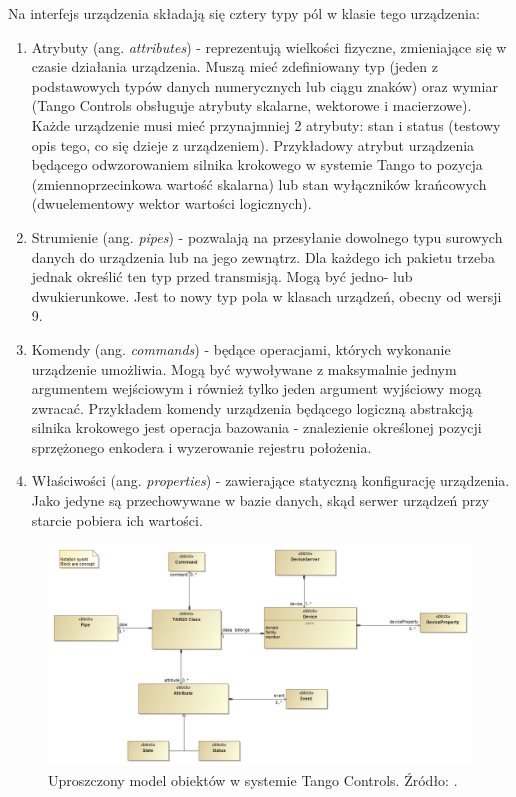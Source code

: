 Na interfejs urządzenia składają się cztery typy pól w klasie tego urządzenia:
\begin{enumerate}
    \item Atrybuty (ang. \emph{attributes}) - reprezentują wielkości fizyczne, zmieniające się w czasie działania urządzenia. Muszą mieć zdefiniowany typ (jeden z podstawowych typów danych numerycznych lub ciągu znaków) oraz wymiar (Tango Controls obsługuje atrybuty skalarne, wektorowe i macierzowe). Każde urządzenie musi mieć przynajmniej 2 atrybuty: stan i status (testowy opis tego, co się dzieje z urządzeniem). Przykładowy atrybut urządzenia będącego odwzorowaniem silnika krokowego w systemie Tango to pozycja (zmiennoprzecinkowa wartość skalarna) lub stan wyłączników krańcowych (dwuelementowy wektor wartości logicznych).
    
    \item Strumienie (ang. \emph{pipes}) - pozwalają na przesyłanie dowolnego typu surowych danych do urządzenia lub na jego zewnątrz. Dla każdego ich pakietu trzeba jednak określić ten typ przed transmisją. Mogą być jedno- lub dwukierunkowe. Jest to nowy typ pola w klasach urządzeń, obecny od wersji 9.
    
    \item Komendy (ang. \emph{commands}) - będące operacjami, których wykonanie urządzenie umożliwia. Mogą być wywoływane z maksymalnie jednym argumentem wejściowym i również tylko jeden argument wyjściowy mogą zwracać. Przykładem komendy urządzenia będącego logiczną abstrakcją silnika krokowego jest operacja bazowania - znalezienie określonej pozycji sprzężonego enkodera i wyzerowanie rejestru położenia.
    
    \item Właściwości (ang. \emph{properties}) - zawierające statyczną konfigurację urządzenia. Jako jedyne są przechowywane w bazie danych, skąd serwer urządzeń przy starcie pobiera ich wartości.
\end{enumerate}

\begin{figure}[tph]
    \centering
    \includegraphics[width=\textwidth]{Grafika/tango_model}
    \caption{Uproszczony model obiektów w systemie Tango Controls. Źródło: \cite{TangoDocs}.}
    \label{fig:tango-model}
\end{figure}

